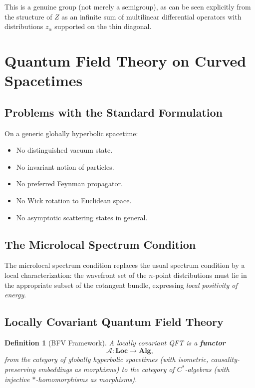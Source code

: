 \documentclass[11pt,a4paper]{article}
\newtheorem{definition}{Definition}[section]
\begin{document}
This is a genuine group (not merely a semigroup), as can be seen explicitly
from the structure of $Z$ as an infinite sum of multilinear differential
operators with distributions $z_\alpha$ supported on the thin diagonal.

\section{Quantum Field Theory on Curved Spacetimes}

\subsection{Problems with the Standard Formulation}

On a generic globally hyperbolic spacetime:
\begin{itemize}[nosep]
  \item No distinguished vacuum state.
  \item No invariant notion of particles.
  \item No preferred Feynman propagator.
  \item No Wick rotation to Euclidean space.
  \item No asymptotic scattering states in general.
\end{itemize}

\subsection{The Microlocal Spectrum Condition}

The microlocal spectrum condition replaces the usual spectrum condition
by a local characterization: the wavefront set of the $n$-point distributions
must lie in the appropriate subset of the cotangent bundle, expressing
\emph{local positivity of energy}.

\subsection{Locally Covariant Quantum Field Theory}

\begin{definition}[BFV Framework]
A locally covariant QFT is a \textbf{functor}
\[
  \mathscr{A}: \mathbf{Loc} \longrightarrow \mathbf{Alg},
\]
from the category of globally hyperbolic spacetimes (with isometric,
causality-preserving embeddings as morphisms) to the category of
$C^*$-algebras (with injective $*$-homomorphisms as morphisms).
\end{definition}
\end{document}
